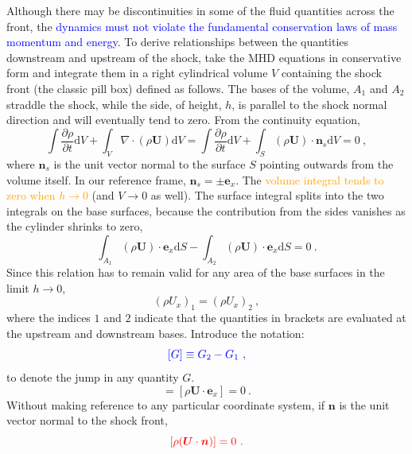 \documentclass[12pt,a4paper]{article}
\renewcommand{\vec}[1]{\boldsymbol{#1}}
\newcommand{\dif}{\mathrm{d}}
\begin{document}
Although there may be discontinuities in some of the fluid quantities across the front, the \textcolor{blue}{dynamics must not violate the fundamental conservation laws of mass momentum and energy}. To derive relationships between the quantities downstream and upstream of the shock, take the MHD equations in conservative form and integrate them in a right cylindrical volume $V$ containing the shock front (the classic pill box) defined as follows. The bases of the volume, $A_1$ and $A_2$ straddle the shock, while the side, of height, $h$, is parallel to the shock normal direction and will eventually tend to zero. From the continuity equation,
\begin{equation*}
\int \frac{\partial \rho}{\partial t} \dif V + \int_V \nabla \cdot (\rho \vec{U}) \dif V = \int \frac{\partial \rho}{\partial t} \dif V + \int_S (\rho \vec{U}) \cdot \vec{n}_s \dif V = 0 ~,
\end{equation*}
where $\vec{n}_s$ is the unit vector normal to the surface $S$ pointing outwards from the volume itself. In our reference frame, $\vec{n}_s = \pm \vec{e}_x$. The \textcolor{orange}{volume integral tends to zero when $h \rightarrow 0$} (and $V \rightarrow 0$ as well). The surface integral splits into the two integrals on the base surfaces, because the contribution from the sides vanishes as the cylinder shrinks to zero,
\begin{equation*}
\int_{A_1} (\rho \vec{U}) \cdot \vec{e}_x \dif S - \int_{A_2} (\rho \vec{U}) \cdot \vec{e}_x \dif S = 0 ~.
\end{equation*}
Since this relation has to remain valid for any area of the base surfaces in the limit $h \rightarrow 0$,
\begin{equation*}
(\rho U_x)_1 = (\rho U_x)_2 ~,
\end{equation*}
where the indices $1$ and $2$ indicate that the quantities in brackets are evaluated at the upstream and downstream bases.  Introduce the notation:
\begin{equation*}
\color{blue} [G] \equiv G_2 -G_1 ~,
\end{equation*}
to denote the jump in any quantity $G$. 
\begin{equation*}
[\rho U_x] = [\rho \vec{U} \cdot \vec{e}_x ] = 0 ~.
\end{equation*}
Without making reference to any particular coordinate system, if $\vec{n}$ is the unit vector normal to the shock front, 
\begin{equation}
\color{red} [\rho (\vec{U} \cdot \vec{n})] = 0 ~.
\end{equation}
\end{document}
